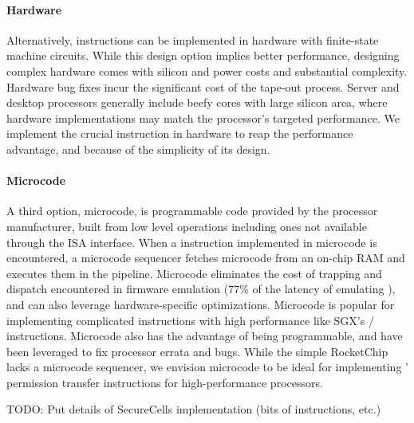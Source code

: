 \paragraph{Hardware}
Alternatively, instructions can be implemented in hardware with 
finite-state machine circuits.
While this design option implies better performance,
designing complex hardware comes with silicon and power costs and
substantial complexity.
Hardware bug fixes incur the significant cost of the tape-out process.
Server and desktop processors generally include beefy cores with
large silicon area, where hardware implementations may match the
processor's targeted performance.
We implement the crucial \sdswitch instruction in hardware
to reap the performance advantage,
and because of the simplicity of its design.

\paragraph{Microcode}
A third option, microcode, is programmable code provided by the 
processor manufacturer, built from low level operations including ones 
not available through the ISA interface.
When a instruction implemented in microcode is encountered, a microcode
sequencer fetches microcode from an on-chip RAM and executes them in the
pipeline.
Microcode eliminates the cost of trapping and dispatch encountered in 
firmware emulation ($77\%$ of the latency of emulating \scprot),
and can also leverage hardware-specific optimizations.
Microcode is popular for implementing complicated instructions
with high performance like SGX's / instructions.
Microcode also has the advantage of being programmable, and have been
leveraged to fix processor errata and bugs.
While the simple RocketChip lacks a microcode sequencer, 
we envision microcode to be ideal for implementing \seccells'
permission transfer instructions for high-performance processors.



TODO: Put details of SecureCells implementation (bits of instructions, etc.)